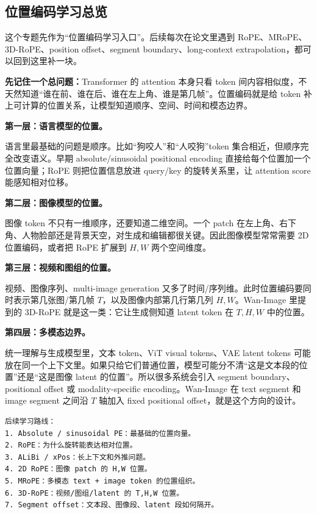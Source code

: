 
\subsection{位置编码学习总览}

这个专题先作为“位置编码学习入口”。后续每次在论文里遇到 RoPE、MRoPE、3D-RoPE、position offset、segment boundary、long-context extrapolation，都可以回到这里补一块。

\begin{intubox}
\textbf{先记住一个总问题：}Transformer 的 attention 本身只看 token 间内容相似度，不天然知道“谁在前、谁在后、谁在左上角、谁是第几帧”。位置编码就是给 token 补上可计算的位置关系，让模型知道顺序、空间、时间和模态边界。
\end{intubox}

\textbf{第一层：语言模型的位置。}

语言里最基础的问题是顺序。比如“狗咬人”和“人咬狗”token 集合相近，但顺序完全改变语义。早期 absolute/sinusoidal positional encoding 直接给每个位置加一个位置向量；RoPE 则把位置信息放进 query/key 的旋转关系里，让 attention score 能感知相对位移。

\textbf{第二层：图像模型的位置。}

图像 token 不只有一维顺序，还要知道二维空间。一个 patch 在左上角、右下角、人物脸部还是背景天空，对生成和编辑都很关键。因此图像模型常常需要 2D 位置编码，或者把 RoPE 扩展到 $H,W$ 两个空间维度。

\textbf{第三层：视频和图组的位置。}

视频、图像序列、multi-image generation 又多了时间/序列维。此时位置编码要同时表示第几张图/第几帧 $T$，以及图像内部第几行第几列 $H,W$。Wan-Image 里提到的 3D-RoPE 就是这一类：它让生成侧知道 latent token 在 $T,H,W$ 中的位置。

\textbf{第四层：多模态边界。}

统一理解与生成模型里，文本 token、ViT visual tokens、VAE latent tokens 可能放在同一个上下文里。如果只给它们普通位置，模型可能分不清“这是文本段的位置”还是“这是图像 latent 的位置”。所以很多系统会引入 segment boundary、positional offset 或 modality-specific encoding。Wan-Image 在 text segment 和 image segment 之间沿 $T$ 轴加入 fixed positional offset，就是这个方向的设计。

\begin{lstlisting}[language={},basicstyle=\ttfamily\small]
后续学习路线：
1. Absolute / sinusoidal PE：最基础的位置向量。
2. RoPE：为什么旋转能表达相对位置。
3. ALiBi / xPos：长上下文和外推问题。
4. 2D RoPE：图像 patch 的 H,W 位置。
5. MRoPE：多模态 text + image token 的位置组织。
6. 3D-RoPE：视频/图组/latent 的 T,H,W 位置。
7. Segment offset：文本段、图像段、latent 段如何隔开。
\end{lstlisting}


